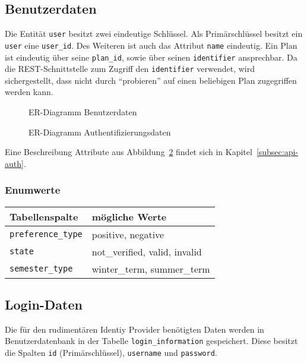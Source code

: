 \subsection{Benutzerdaten}
Die Entität \texttt{user} besitzt zwei eindeutige Schlüssel. Als Primärschlüssel besitzt ein \texttt{user} eine \texttt{user\_id}. Des Weiteren ist auch das Attribut \texttt{name} eindeutig.
Ein Plan ist eindeutig über seine \texttt{plan\_id}, sowie über seinen \texttt{identifier} ansprechbar. Da die REST-Schnittstelle zum Zugriff den \texttt{identifier} verwendet, wird sichergestellt, dass nicht durch \enquote{probieren} auf einen beliebigen Plan zugegriffen werden kann.
\begin{figure}[H]
	
	\caption{ER-Diagramm Benutzerdaten}
	\label{fig:user-er}
\end{figure}
\begin{figure}[H]
	
	\caption{ER-Diagramm Authentifizierungsdaten}
	\label{fig:auth-er}
\end{figure}

Eine Beschreibung Attribute aus Abbildung~\ref{fig:auth-er} findet sich in Kapitel~\ref{subsec:api-auth}.
\subsubsection{Enumwerte}
\begin{table}[h]
	\begin{tabular}{|l|l|}
		\hline
		\textbf{Tabellenspalte} & \textbf{mögliche Werte} \\ \hline
		\texttt{preference\_type} & positive, negative \\ \hline
		\texttt{state} & not\_verified, valid, invalid \\ \hline
		\texttt{semester\_type} & winter\_term, summer\_term \\ \hline
	\end{tabular}
\end{table}

\subsection{Login-Daten}
Die für den rudimentären Identiy Provider benötigten Daten werden in Benutzerdatenbank in der Tabelle \texttt{login\_information} gespeichert. Diese besitzt die Spalten \texttt{id} (Primärschlüssel), \texttt{username} und \texttt{password}.